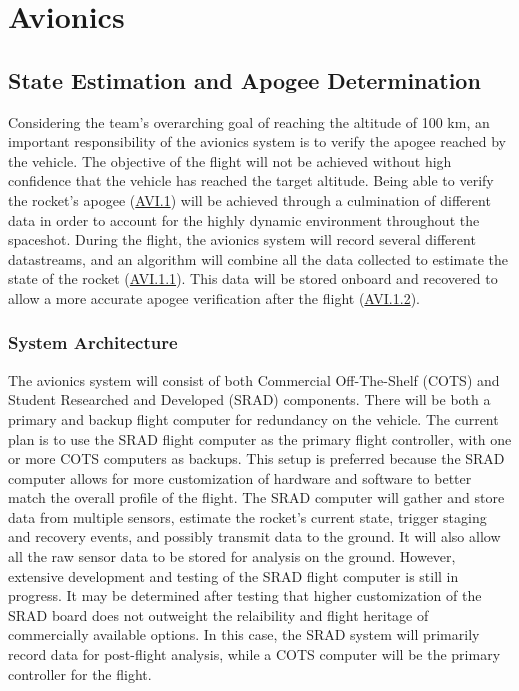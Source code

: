 \section{Avionics} \label{section:avionics}
\subsection{State Estimation and Apogee Determination}

Considering the team’s overarching goal of reaching the altitude of 100 km, an important responsibility of the avionics system is to verify the apogee reached by the vehicle. The objective of the flight will not be achieved without high confidence that the vehicle has reached the target altitude. Being able to verify the rocket’s apogee (\hyperlink{AVI.1}{AVI.1}) will be achieved through a culmination of different data in order to account for the highly dynamic environment throughout the spaceshot. During the flight, the avionics system will record several different datastreams, and an algorithm will combine all the data collected to estimate the state of the rocket (\hyperlink{AVI.1.1}{AVI.1.1}). This data will be stored onboard and recovered to allow a more accurate apogee verification after the flight (\hyperlink{AVI.1.2}{AVI.1.2}).


\subsubsection{System Architecture}
The avionics system will consist of both Commercial Off-The-Shelf (COTS) and Student Researched and Developed (SRAD) components. There will be both a primary and backup flight computer for redundancy on the vehicle. The current plan is to use the SRAD flight computer as the primary flight controller, with one or more COTS computers as backups. This setup is preferred because the SRAD computer allows for more customization of hardware and software to better match the overall profile of the flight. The SRAD computer will gather and store data from multiple sensors, estimate the rocket’s current state, trigger staging and recovery events, and possibly transmit data to the ground. It will also allow all the raw sensor data to be stored for analysis on the ground. However, extensive development and testing of the SRAD flight computer is still in progress. It may be determined after testing that higher customization of the SRAD board does not outweight the relaibility and flight heritage of commercially available options. In this case, the SRAD system will primarily record data for post-flight analysis, while a COTS computer will be the primary controller for the flight.

